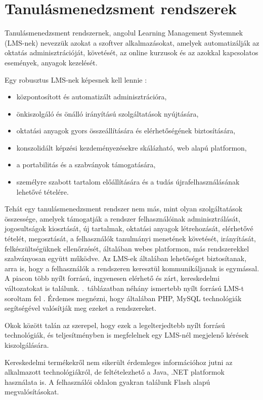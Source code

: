\chapter{Tanulásmenedzsment rendszerek}
Tanulásmenedzsment rendszernek, angolul Learning Management Systemnek (LMS-nek) nevezzük azokat a szoftver alkalmazásokat, amelyek automatizálják az oktatás adminisztrációját, követését, az online kurzusok és az azokkal kapcsolatos események, anyagok kezelését.

Egy robusztus LMS-nek képesnek kell lennie \cite{link:ell}:
\begin{itemize}
\setlength{\itemsep}{0pt}
\item központosított és automatizált adminisztrációra,
\item önkiszolgáló és önálló irányítású szolgáltatások nyújtására,
\item oktatási anyagok gyors összeállítására és elérhetőségének biztosítására,
\item konszolidált képzési kezdeményezésekre skálázható, web alapú platformon,
\item a portabilitás és a szabványok támogatására,
\item személyre szabott tartalom előállítására és a tudás újrafelhasználásának lehetővé tételére.
\end{itemize}

Tehát egy tanulásmenedzsment rendszer nem más, mint olyan szolgáltatások összessége, amelyek támogatják a rendszer felhasználóinak adminisztrálását, jogosultságok kiosztását, új tartalmak, oktatási anyagok létrehozását, elérhetővé tételét, megosztását, a felhasználók tanulmányi menetének követését, irányítását, felkészültségüknek ellenőrzését, általában webes platformon, más rendszerekkel szabványosan együtt működve. Az LMS-ek általában lehetőséget biztosítanak, arra is, hogy a felhasználók a rendszeren keresztül kommunikáljanak is egymással.
A piacon több nyílt forrású, ingyenesen elérhető és zárt, kereskedelmi változatokat is találunk. .~táblázatban néhány ismertebb nyílt forrású LMS-t soroltam fel \cite{link:lms}. Érdemes megnézni, hogy általában PHP, MySQL technológiák segítségével valósítják meg ezeket a rendszereket.


Okok között talán az szerepel, hogy ezek a legelterjedtebb nyílt forrású technológiák, és teljesítményben is megfelelnek egy LMS-nél megjelenő kérések kiszolgálására. 

Kereskedelmi termékekről nem sikerült érdemleges információhoz jutni az alkalmazott technológiákról, de feltételezhető a Java, .NET platformok használata is. A felhasználói oldalon gyakran találunk Flash alapú megvalósításokat.

